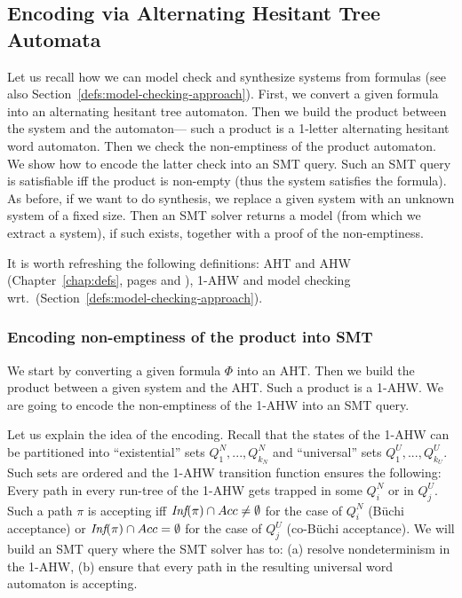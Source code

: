 \subsection{Encoding via Alternating Hesitant Tree Automata}\label{bosy:ctlstar-synt:aht}


Let us recall how we can model check and synthesize systems from \CTLstar formulas
(see also Section~\ref{defs:model-checking-approach}).
First,
we convert a given \CTLstar formula into an alternating hesitant tree automaton.
Then we build the product between the system and the automaton---%
such a product is a 1-letter alternating hesitant word automaton.
Then we check the non-emptiness of the product automaton.
We show how to encode the latter check into an SMT query.
Such an SMT query is satisfiable iff the product is non-empty
(thus the system satisfies the formula).
As before, if we want to do synthesis, we replace a given system
with an unknown system of a fixed size.
Then an SMT solver returns a model (from which we extract a system), if such exists,
together with a proof of the non-emptiness.

It is worth refreshing the following definitions:
AHT and AHW (Chapter~\ref{chap:defs}, pages \pageref{page:defs:aht} and \pageref{page:defs:ahw}),
1-AHW and model checking wrt.\ \CTLstar (Section~\ref{defs:model-checking-approach}).


\subsubsection{Encoding non-emptiness of the product into SMT}

We start by converting a given \CTLstar formula $\Phi$ into an AHT.
Then we build the product between a given system and the AHT.
Such a product is a 1-AHW.
We are going to encode the non-emptiness of the 1-AHW into an SMT query.

Let us explain the idea of the encoding.
Recall that the states of the 1-AHW can be partitioned into
``existential'' sets $Q^N_1, ..., Q^N_{k_N}$ and
``universal'' sets $Q^U_1, ..., Q^U_{k_U}$.
Such sets are ordered and the 1-AHW transition function ensures the following:
Every path in every run-tree of the 1-AHW
gets trapped in some $Q^N_i$ or in $Q^U_j$.
Such a path $\pi$ is accepting iff
$\textit{Inf}(\pi) \cap Acc \neq \emptyset$ for the case of $Q^N_i$ (B\"uchi acceptance)
or $\textit{Inf}(\pi) \cap Acc = \emptyset$ for the case of $Q^U_j$ (co-B\"uchi acceptance).
We will build an SMT query where the SMT solver has to:
(a) resolve nondeterminism in the 1-AHW,
(b) ensure that every path in the resulting universal word automaton is accepting.

